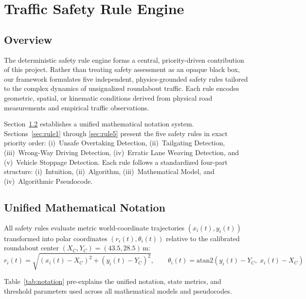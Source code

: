 \chapter{Traffic Safety Rule Engine}
\label{chap:safety}

\section{Overview}

The deterministic safety rule engine forms a central, priority-driven contribution of this project. Rather than treating safety assessment as an opaque black box, our framework formulates five independent, physics-grounded safety rules tailored to the complex dynamics of unsignalized roundabout traffic. Each rule encodes geometric, spatial, or kinematic conditions derived from physical road measurements and empirical traffic observations.

Section~\ref{sec:notation} establishes a unified mathematical notation system. Sections~\ref{sec:rule1} through \ref{sec:rule5} present the five safety rules in exact priority order: (i)~Unsafe Overtaking Detection, (ii)~Tailgating Detection, (iii)~Wrong-Way Driving Detection, (iv)~Erratic Lane Weaving Detection, and (v)~Vehicle Stoppage Detection. Each rule follows a standardized four-part structure: (i)~Intuition, (ii)~Algorithm, (iii)~Mathematical Model, and (iv)~Algorithmic Pseudocode.

\section{Unified Mathematical Notation}
\label{sec:notation}

All safety rules evaluate metric world-coordinate trajectories $(x_i(t), y_i(t))$ transformed into polar coordinates $(r_i(t), \theta_i(t))$ relative to the calibrated roundabout center $(X_C, Y_C) = (43.5, 28.5)$\,m:
\begin{equation}
    r_i(t) = \sqrt{(x_i(t) - X_C)^2 + (y_i(t) - Y_C)^2}, \qquad
    \theta_i(t) = \mathrm{atan2}(y_i(t) - Y_C,\;x_i(t) - X_C)
\end{equation}

Table~\ref{tab:notation} pre-explains the unified notation, state metrics, and threshold parameters used across all mathematical models and pseudocodes.

